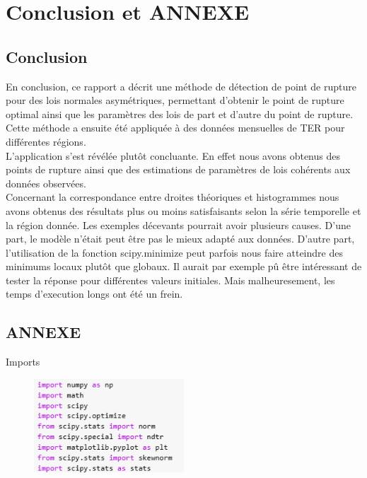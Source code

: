 \chapter*{Conclusion et ANNEXE}

\hspace{0.58cm}

\section {Conclusion}

En conclusion, ce rapport a décrit une méthode de détection de point de rupture pour des lois normales asymétriques, permettant d'obtenir le point de rupture optimal ainsi que les paramètres des lois de part et d'autre du point de rupture. Cette méthode a ensuite été appliquée à des données mensuelles de TER pour différentes régions. \\

L'application s'est révélée plutôt concluante. En effet nous avons obtenus des points de rupture ainsi que des estimations de paramètres de lois cohérents aux données observées.\\

Concernant la correspondance entre droites théoriques et histogrammes nous avons obtenus des résultats plus ou moins satisfaisants selon la série temporelle et la région donnée. Les exemples décevants pourrait avoir plusieurs causes. D'une part, le modèle n'était peut être pas le mieux adapté aux données. D'autre part, l'utilisation de la fonction scipy.minimize peut parfois nous faire atteindre des minimums locaux plutôt que globaux. Il aurait par exemple pû être intéressant de tester la réponse pour différentes valeurs initiales. Mais malheuresement, les temps d'execution longs ont été un frein.

\newpage
\section {ANNEXE}

Imports

\begin{figure}[H]
  \includegraphics[width=0.5\textwidth]{imports.png}
\end{figure}


